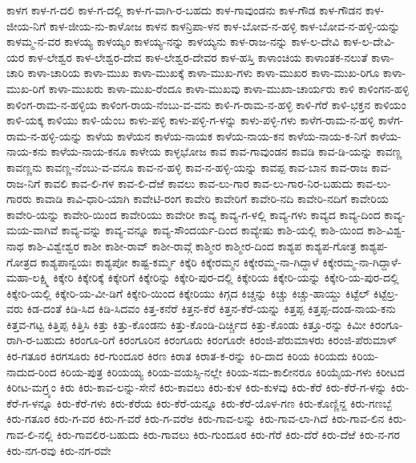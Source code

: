 ಕಾಳಗ
ಕಾಳ-ಗ-ದಲಿ
ಕಾಳ-ಗ-ದಲ್ಲಿ
ಕಾಳ-ಗ-ವಾಗಿ-ರ-ಬಹದು
ಕಾಳ-ಗಾವುಂಡನು
ಕಾಳ-ಗೌಡ
ಕಾಳ-ಗೌಡನ
ಕಾಳ-ಜೀಯ-ನಿಗೆ
ಕಾಳ-ಜೀಯ-ನು-ಕಾಳೋಜ
ಕಾಳನ
ಕಾಳನ್ರಿಪಾ-ಳನ
ಕಾಳ-ಬೋವ-ನ-ಹಳ್ಳಿ
ಕಾಳ-ಬೋವ-ನ-ಹಳ್ಳಿ-ಯನ್ನು
ಕಾಳಮ್ಮ-ನ-ವರ
ಕಾಳಯ್ಯ
ಕಾಳಯ್ಯಂ
ಕಾಳಯ್ಯ-ನನ್ನು
ಕಾಳಯ್ಯನು
ಕಾಳ-ರಾಜ-ನನ್ನು
ಕಾಳ-ಲ-ದೇವಿ
ಕಾಳ-ಲ-ದೇವಿ-ಯರ
ಕಾಳ-ಲೇಶ್ವರ
ಕಾಳ-ಲೇಶ್ವರ-ದೇವ
ಕಾಳ-ಲೇಶ್ವರ-ದೇವರ
ಕಾಳ-ಹಸ್ತಿ
ಕಾಳಾಂಚಿಯ
ಕಾಳಾಂತಕ-ನಲುತೆ
ಕಾಳಾ-ಚಾರಿ
ಕಾಳಾ-ಚಾರಿಯ
ಕಾಳಾ-ಮುಖ
ಕಾಳಾ-ಮುಖಕ್ಕೆ
ಕಾಳಾ-ಮುಖ-ಗಳು
ಕಾಳಾ-ಮುಖರ
ಕಾಳಾ-ಮುಖ-ರಿಗೂ
ಕಾಳಾ-ಮುಖ-ರಿಗೆ
ಕಾಳಾ-ಮುಖರು
ಕಾಳಾ-ಮುಖ-ರೆಂದೂ
ಕಾಳಾ-ಮುಖವು
ಕಾಳಾ-ಮುಖಾ-ಚಾರ್ಯರು
ಕಾಳಿ
ಕಾಳಿಂಗನ-ಹಳ್ಳಿ
ಕಾಳಿಂಗ-ರಾಮ-ನ-ಹಳ್ಳಿಯ
ಕಾಳಿಂಗ-ರಾಯ-ನೆಂಬು-ವ-ವನು
ಕಾಳಿ-ಗ-ರಾಮ-ನ-ಹಳ್ಳಿ
ಕಾಳಿ-ಗೆರೆ
ಕಾಳಿ-ಭಕ್ತನ
ಕಾಳಿಯಂ
ಕಾಳಿ-ಯಕ್ಕ
ಕಾಳಿಯು
ಕಾಳಿ-ಯೆಂಬ
ಕಾಳು-ಪಳ್ಳಿ
ಕಾಳು-ಪಳ್ಳಿ-ಗ-ಳನ್ನು
ಕಾಳು-ಪಳ್ಳಿ-ಗಳು
ಕಾಳೆಗ-ರಾಮ-ನ-ಹಳ್ಳಿ
ಕಾಳೆಗ-ರಾಮ-ನ-ಹಳ್ಳಿ-ಯನ್ನು
ಕಾಳೆಯ
ಕಾಳೆಯನ
ಕಾಳೆಯ-ನಾಯಕ
ಕಾಳೆಯ-ನಾಯ-ಕನ
ಕಾಳೆಯ-ನಾಯ-ಕ-ನಿಗೆ
ಕಾಳೆಯ-ನಾಯ-ಕನು
ಕಾಳೆಯ-ನಾಯ-ಕನೂ
ಕಾಳೇಯ
ಕಾಳ್ಳಭೋಜ
ಕಾವ
ಕಾವ-ಗಾವುಂಡನ
ಕಾವಡಿ
ಕಾವ-ಡಿ-ಯನ್ನು
ಕಾವಣ್ಣ
ಕಾವಣ್ಣನು
ಕಾವಣ್ಣ-ನೆಂಬು-ವ-ವನೂ
ಕಾವ-ನ-ಹಳ್ಳಿ
ಕಾವ-ನ-ಹಳ್ಳಿ-ಯನ್ನು
ಕಾವಪ್ಪ
ಕಾವ-ಬಾನ
ಕಾವ-ರಾಜ
ಕಾವ-ರಾಜ-ನಿಗೆ
ಕಾವಲಿ
ಕಾವ-ಲಿ-ಗಳ
ಕಾವ-ಲಿ-ದೆಱೆ
ಕಾವಲು
ಕಾವ-ಲು-ಗಾರ
ಕಾವ-ಲು-ಗಾರ-ನಿರ-ಬಹುದು
ಕಾವ-ಲು-ಗಾರರು
ಕಾವಾಡಿ
ಕಾವಿ-ಧಾರಿ-ಯಾಗಿ
ಕಾವೇಟಿ-ರಂಗ
ಕಾವೇರಿ
ಕಾವೇರಿಗೆ
ಕಾವೇರಿ-ನದಿ
ಕಾವೇರಿ-ನದಿಗೆ
ಕಾವೇರಿಯ
ಕಾವೇರಿ-ಯನ್ನು
ಕಾವೇರಿ-ಯಿಂದ
ಕಾವೇರಿಯು
ಕಾವೇರೀ
ಕಾವ್ಯ
ಕಾವ್ಯ-ಗ-ಳಲ್ಲಿ
ಕಾವ್ಯ-ಗಳು
ಕಾವ್ಯದ
ಕಾವ್ಯ-ದಿಂದ
ಕಾವ್ಯ-ಮಯ-ವಾಗಿವೆ
ಕಾವ್ಯ-ವನ್ನು
ಕಾವ್ಯ-ವನ್ನೂ
ಕಾವ್ಯ-ಸೌಂದರ್ಯ-ದಿಂದ
ಕಾವ್ಯೇಷು
ಕಾಶಿ-ಯಲ್ಲಿ
ಕಾಶಿ-ಯಿಂದ
ಕಾಶಿ-ವಿಶ್ವ-ನಾಥ
ಕಾಶಿ-ವಿಶ್ವೇಶ್ವರ
ಕಾಶೀ
ಕಾಶೀ-ರಾವ್
ಕಾಶೀ-ರಾವ್ಗೆ
ಕಾಶ್ಮೀರ
ಕಾಶ್ಮೀರ-ದಿಂದ
ಕಾಶ್ಯಪ
ಕಾಶ್ಯಪ-ಗೋತ್ರ
ಕಾಶ್ಯಪ-ಗೋತ್ರದ
ಕಾಶ್ಯಪಾನ್ವಯಃ
ಕಾಶ್ಯಪೋ
ಕಾಷ್ಟ-ಕರ್ಮ್ಮ
ಕಿಕ್ಕೆರಿ
ಕಿಕ್ಕೇರಮ್ಮನ
ಕಿಕ್ಕೇರಮ್ಮ-ನಾ-ಗಿದ್ದಾಳೆ
ಕಿಕ್ಕೇರಮ್ಮ-ನಾ-ಗಿದ್ದಾಳೆ-ಮಹಾ-ಲಕ್ಷ್ಮಿ
ಕಿಕ್ಕೇರಿ
ಕಿಕ್ಕೇರಿಕ್ಕೆ
ಕಿಕ್ಕೇರಿಗೆ
ಕಿಕ್ಕೇರಿನ್ನು
ಕಿಕ್ಕೇರಿ-ಪುರ-ದಲ್ಲಿ
ಕಿಕ್ಕೇರಿಯ
ಕಿಕ್ಕೇರಿ-ಯನ್ನು
ಕಿಕ್ಕೇರಿ-ಯ-ಪುರ-ದಲ್ಲಿ
ಕಿಕ್ಕೇರಿ-ಯಲ್ಲಿ
ಕಿಕ್ಕೇರಿ-ಯ-ವೀ-ಡಿಗೆ
ಕಿಕ್ಕೇರಿ-ಯಿಂದ
ಕಿಕ್ಕೇರಿಯು
ಕಿಗ್ಗದ
ಕಿಚ್ಚನ್ನು
ಕಿಚ್ಚು
ಕಿಚ್ಚು-ಹಾಯ್ದು
ಕಿಟ್ಟೆಲ್
ಕಿಟ್ಟೆಲ್ರ-ವರು
ಕಿಡ-ದಂತೆ
ಕಿಡಿ-ಸಿದ
ಕಿಡಿ-ಸಿದವಂ
ಕಿತ್ತ-ಕನೆರೆ
ಕಿತ್ತನ-ಕೆರೆ
ಕಿತ್ತನ-ಕೆರೆ-ಯನ್ನು
ಕಿತ್ತಪ್ಪ
ಕಿತ್ತಪ್ಪ-ದಂಡ-ನಾಯ-ಕನು
ಕಿತ್ತವ-ಗಟ್ಟ
ಕಿತ್ತಿಪ್ಪ
ಕಿತ್ತಿಸಿ
ಕಿತ್ತು
ಕಿತ್ತು-ಕೊಂಡನು
ಕಿತ್ತು-ಕೊಂಡಿ-ದಿರ್ಚ್ಚಿದ
ಕಿತ್ತು-ಕೊಂಡು
ಕಿತ್ತೂ-ರನ್ನು
ಕಿಮೀ
ಕಿರಂಗೂ-ರಾಗಿ-ರ-ಬಹುದು
ಕಿರಂಗೂ-ರಿಗೆ
ಕಿರಂಗೂರಿನ
ಕಿರಂಗೂರು
ಕಿರಂಗೂರೇ
ಕಿರಂಜಿ-ಪೆರುಮಾಳರು
ಕಿರಂಜಿ-ಪೆರುಮಾಳ್
ಕಿರ-ಗತೂರ
ಕಿರಗಸೂರು
ಕಿರ-ಗುಂದೂರ
ಕಿರಣ
ಕಿರಾತ
ಕಿರಾತ-ಕ-ರನ್ನು
ಕಿರಿ-ದಾದ
ಕಿರಿಯ
ಕಿರಿಯದು
ಕಿರಿಯ-ನಾದುದ-ರಿಂದ
ಕಿರಿಯ-ಪುತ್ರ
ಕಿರಿಯಯ್ಯ
ಕಿರಿಯ-ವಯಸ್ಸಿ-ನಲ್ಲೇ
ಕಿರಿಯ-ಸಮ-ಕಾಲೀನರೂ
ಕಿರಿಯೈಯ-ಗಳು
ಕಿರೀಟದ
ಕಿರೀಟ-ಮಗ್ರ್ಯಂ
ಕಿರು
ಕಿರು-ಕಾವ-ಲನ್ನು-ಸೇನೆ
ಕಿರು-ಕಾವಲು
ಕಿರು-ಕುಳ
ಕಿರು-ಕುಳವು
ಕಿರು-ಕೆರೆ
ಕಿರು-ಕೆರೆ-ಗ-ಳನ್ನು
ಕಿರು-ಕೆರೆ-ಗ-ಳನ್ನೂ
ಕಿರು-ಕೆರೆ-ಗಳು
ಕಿರು-ಕೆರೆಯ
ಕಿರು-ಕೆರೆ-ಯನ್ನೂ
ಕಿರು-ಕೆರೆ-ಯೊಳ-ಗಣ
ಕಿರು-ಕೊಣ್ಣಿನ್ದ
ಕಿರು-ಗಣಬ್ಬೆ
ಕಿರು-ಗತೂರ
ಕಿರು-ಗ-ವರ
ಕಿರು-ಗ-ವರೆ
ಕಿರು-ಗ-ವರೆಅ
ಕಿರು-ಗಾವ-ಲನ್ನು
ಕಿರು-ಗಾವ-ಲಾ-ಗಿದೆ
ಕಿರು-ಗಾವ-ಲಿನ
ಕಿರು-ಗಾವ-ಲಿ-ನಲ್ಲಿ
ಕಿರು-ಗಾವಲಿರ-ಬಹುದು
ಕಿರು-ಗಾವಲು
ಕಿರು-ಗುಂದೂರ
ಕಿರು-ಗೆರೆ
ಕಿರು-ದೆರೆ
ಕಿರು-ದೆಱೆ
ಕಿರು-ನ-ಗರ
ಕಿರು-ನಗ-ರವು
ಕಿರು-ನಗ-ರವೇ
